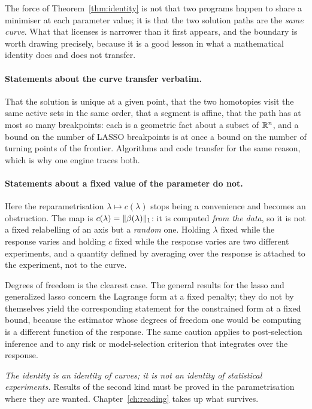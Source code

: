 The force of Theorem~\ref{thm:identity} is not that two programs happen to share a
minimiser at each parameter value; it is that the two solution paths are the
\emph{same curve}. What that licenses is narrower than it first appears, and the
boundary is worth drawing precisely, because it is a good lesson in what a
mathematical identity does and does not transfer.

\paragraph{Statements about the curve transfer verbatim.} That the solution is unique
at a given point, that the two homotopies visit the same active sets in the same
order, that a segment is affine, that the path has at most so many breakpoints: each
is a geometric fact about a subset of $\mathbb{R}^n$, and a bound on the number of LASSO
breakpoints is at once a bound on the number of turning points of the frontier.
Algorithms and code transfer for the same reason, which is why one engine traces both.

\paragraph{Statements about a fixed value of the parameter do not.} Here the
reparametrisation $\lambda \mapsto c(\lambda)$ stops being a convenience and becomes
an obstruction. The map is $c(\lambda) = \lVert \beta(\lambda) \rVert_1$: it is computed
\emph{from the data}, so it is not a fixed relabelling of an axis but a \emph{random}
one. Holding $\lambda$ fixed while the response varies and holding $c$ fixed while
the response varies are two different experiments, and a quantity defined by averaging
over the response is attached to the experiment, not to the curve.

Degrees of freedom is the clearest case. The general results for the lasso and
generalized lasso \cite{tibshirani2012df,zou2007df} concern the Lagrange form at a
fixed penalty; they do not by themselves yield the corresponding statement for the
constrained form at a fixed bound, because the estimator whose degrees of freedom one
would be computing is a different function of the response. The same caution applies
to post-selection inference \cite{lee2016,tibshirani2016psi} and to any risk or
model-selection criterion that integrates over the response.

\emph{The identity is an identity of curves; it is not an identity of statistical
experiments.} Results of the second kind must be proved in the parametrisation where
they are wanted. Chapter~\ref{ch:reading} takes up what survives.

